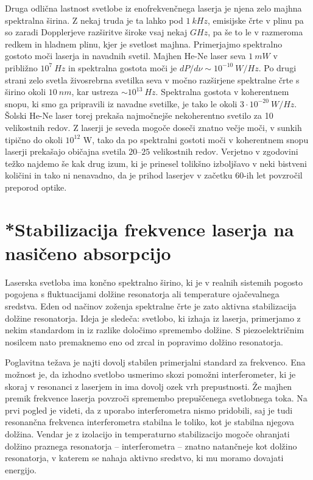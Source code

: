 Druga odlična lastnost svetlobe iz enofrekvenčnega laserja je njena zelo majhna
spektralna širina. Z nekaj truda je ta lahko pod $1~\si{kHz}$, emisijske 
črte v plinu pa so zaradi Dopplerjeve razširitve široke vsaj nekaj $\si{GHz}$, 
pa še to le v razmeroma redkem in hladnem plinu, kjer je svetlost majhna.
Primerjajmo spektralno gostoto moči laserja in navadnih svetil. Majhen He-Ne
laser seva $1~\si{mW}$ v približno $10^{7}~\si{Hz}$ in spektralna gostota
moči je $dP/d\nu \sim 10^{-10}~\si{W/Hz}$. Po drugi strani zelo svetla 
živosrebrna svetilka seva v močno razširjene spektralne črte s širino okoli 
$10~\si{nm}$, kar ustreza $\sim 10^{13}~\si{Hz}$. 
Spektralna gostota v koherentnem snopu, ki smo ga pripravili iz
navadne svetilke, je tako le okoli $3\cdot 10^{-20}~\si{W/Hz}$. Šolski
He-Ne laser torej prekaša najmočnejše nekoherentno svetilo za 10
velikostnih redov. Z laserji je seveda mogoče doseči znatno večje
moči, v sunkih tipično do okoli $10^{12}$ W, tako da po spektralni gostoti moči v
koherentnem snopu laserji prekašajo običajna svetila $20$--$25$
velikostnih redov. Verjetno v zgodovini težko najdemo še kak drug izum, 
ki je prinesel tolikšno izboljšavo v neki bistveni količini in tako ni 
nenavadno, da je prihod laserjev v začetku 60-ih let povzročil preporod optike.

\section{*Stabilizacija frekvence laserja na nasičeno absorpcijo}
\label{chap:stabilizacija}
Laserska svetloba ima končno spektralno širino, ki 
je v realnih sistemih pogosto pogojena s fluktuacijami dolžine resonatorja ali 
temperature ojačevalnega sredstva. Eden od načinov 
zoženja spektralne črte je zato aktivna stabilizacija
dolžine resonatorja. Ideja je sledeča: svetlobo, ki izhaja iz laserja, primerjamo
z nekim standardom in iz razlike določimo spremembo dolžine. S
piezoelektričnim nosilcem nato premaknemo eno od zrcal in popravimo 
dolžino resonatorja. 

Poglavitna težava je najti dovolj stabilen primerjalni standard za frekvenco. 
Ena možnost je, da izhodno svetlobo usmerimo skozi pomožni 
interferometer, 
ki je skoraj v resonanci z laserjem in ima dovolj ozek vrh prepustnosti. Že majhen 
premik frekvence laserja povzroči spremembo prepuščenega svetlobnega toka. 
Na prvi pogled je videti, da z uporabo interferometra nismo pridobili, 
saj je tudi resonančna frekvenca interferometra stabilna le toliko, kot je 
stabilna njegova dolžina. Vendar je z izolacijo in temperaturno stabilizacijo 
mogoče ohranjati dolžino praznega resonatorja -- interferometra -- znatno
natančneje kot dolžino resonatorja, v katerem se nahaja aktivno sredstvo, ki mu 
moramo dovajati energijo.

